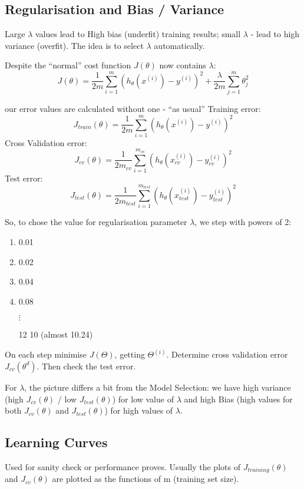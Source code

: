 \documentclass{scrartcl}
\begin{document}
\subsection{Regularisation and Bias / Variance}
\label{sec:10-5}

Large $\lambda$ values lead to High bias (underfit) training results;
small $\lambda$ - lead to high variance (overfit). The idea is to
select $\lambda$ automatically.

Despite the ``normal'' cost function $J(\theta)$ now contains
$\lambda$:
\[J(\theta) = \frac{1}{2m} \sum \limits_{i=1}^{m}(h_\theta(x^{(i)}) -
y^{(i)})^2 + \frac{\lambda}{2m} \sum \limits_{j=1}^{m} \theta_j^2 \]

our error values are calculated without one - ``as usual'' Training
error:
\[ J_{train}(\theta) = \frac{1}{2m} \sum
\limits_{i=1}^{m}(h_\theta(x^{(i)}) - y^{(i)})^2 \] Cross Validation
error:
\[ J_{cv}(\theta) = \frac{1}{2m_{cv}} \sum
\limits_{i=1}^{m_{cv}}(h_\theta(x_{cv}^{(i)}) - y_{cv}^{(i)})^2 \]
Test error:
\[ J_{test}(\theta) = \frac{1}{2m_{test}} \sum
\limits_{i=1}^{m_{test}}(h_\theta(x_{test}^{(i)}) -
y_{test}^{(i)})^2 \]

So, to chose the value for regularisation parameter $\lambda$, we step
with powers of 2:
\begin{enumerate}
\item 0.01
\item 0.02
\item 0.04
\item 0.08

  $\vdots$
\item[12] 10 (almost 10.24)
\end{enumerate}

On each step minimise $J(\Theta)$, getting $\Theta^{(i)}$. Determine
cross validation error $J_{cv}(\theta^{d})$. Then check the test
error.

For $\lambda$, the picture differs a bit from the Model Selection: we
have high variance (high $J_{cv}(\theta)$ / low $J_{test}(\theta)$)
for low value of $\lambda$ and high Bias (high values for both
$J_{cv}(\theta)$ and $J_{test}(\theta)$) for high values of $\lambda$.

\subsection{Learning Curves}
\label{sec:10-6}

Used for sanity check or performance proves. Usually the plots of
$J_{training}(\theta)$ and $J_{cv}(\theta)$ are plotted as the
functions of m (training set size).
\end{document}
